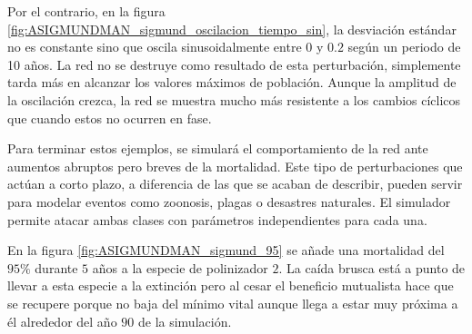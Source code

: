 Por el contrario, en la figura \ref{fig:ASIGMUNDMAN_sigmund_oscilacion_tiempo_sin}, la desviación estándar no es constante sino que oscila sinusoidalmente entre $0$ y $0.2$ según un periodo de 10 años. La red no se destruye como resultado de esta perturbación, simplemente tarda más en alcanzar los valores máximos de población. Aunque la amplitud de la oscilación crezca, la red se muestra mucho más resistente a los cambios cíclicos que cuando estos no ocurren en fase.

Para terminar estos ejemplos, se simulará el comportamiento de la red ante aumentos abruptos pero breves de la mortalidad. Este tipo de perturbaciones que actúan a corto plazo, a diferencia de las que se acaban de describir, pueden servir para modelar eventos como zoonosis, plagas o desastres naturales. El simulador permite atacar ambas clases con parámetros independientes para cada una.

En la figura \ref{fig:ASIGMUNDMAN_sigmund_95} se añade una mortalidad del $95\%$ durante $5$ años a la especie de polinizador $2$. La caída brusca está a punto de llevar a esta especie a la extinción pero al cesar el beneficio mutualista hace que se recupere porque no baja del mínimo vital aunque llega a estar muy próxima a él alrededor del año $90$ de la simulación.

